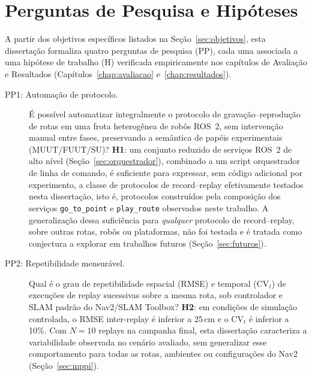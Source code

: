 \section{Perguntas de Pesquisa e Hipóteses}
\label{sec:perguntas_pesquisa}

A partir dos objetivos específicos listados na Seção~\ref{sec:objetivos}, esta
dissertação formaliza quatro perguntas de pesquisa (PP), cada uma associada a
uma hipótese de trabalho (H) verificada empiricamente nos capítulos de
Avaliação e Resultados (Capítulos~\ref{chap:avaliacao} e~\ref{chap:resultados}).

\begin{description}
    \item[PP1: Automação de protocolo.] É possível automatizar integralmente
    o protocolo de gravação--reprodução de rotas em uma frota heterogênea de
    robôs ROS~2, sem intervenção manual entre fases, preservando a semântica
    de papéis experimentais (MUUT/FUUT/SU)?
    \textbf{H1}: um conjunto reduzido de serviços ROS~2 de alto nível
    (Seção~\ref{sec:orquestrador}), combinado a um script orquestrador de
    linha de comando, é suficiente para expressar, sem código adicional por
    experimento, a classe de protocolos de record--replay efetivamente
    testados nesta dissertação, isto é, protocolos construídos pela
    composição dos serviços \texttt{go\_\allowbreak to\_\allowbreak point} e
    \texttt{play\_\allowbreak route} observados neste trabalho. A generalização dessa suficiência para
    \emph{qualquer} protocolo de record--replay, sobre outras rotas, robôs
    ou plataformas, não foi testada e é tratada como conjectura a explorar
    em trabalhos futuros (Seção~\ref{sec:futuros}).

    \item[PP2: Repetibilidade mensurável.] Qual é o grau de repetibilidade
    espacial (RMSE) e temporal (CV$_t$) de execuções de replay sucessivas sobre
    a mesma rota, sob controlador e SLAM padrão do Nav2/SLAM Toolbox?
    \textbf{H2}: em condições de simulação controlada, o RMSE inter-replay é
    inferior a 25\,cm e o CV$_t$ é inferior a 10\%. Com $N=10$ replays na
    campanha final, esta dissertação caracteriza a variabilidade observada no
    cenário avaliado, sem generalizar esse comportamento para todas as rotas,
    ambientes ou configurações do Nav2 (Seção~\ref{sec:mppi}).


\end{description}
